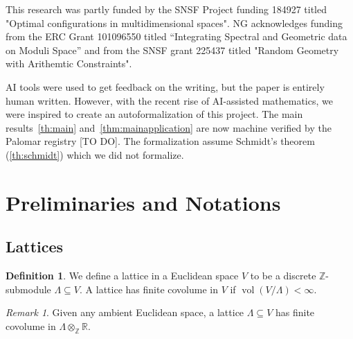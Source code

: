 \documentclass{amsart}
\theoremstyle{definition}
\newtheorem{definition}[theorem]{Definition}
\theoremstyle{remark}
\newtheorem{remark}[theorem]{Remark}
\DeclareMathOperator{\vol}{vol}
\DeclareMathOperator{\N}{N}
\newcommand{\nihar}{\color{olive}}
\begin{document}
This research was partly funded by the SNSF Project funding 184927 titled "Optimal configurations in multidimensional spaces". 
NG acknowledges funding from the ERC Grant
101096550 titled ``Integrating Spectral and Geometric data on Moduli Space'' and 
from the SNSF grant 225437 titled "Random Geometry with Arithemtic Constraints". 

AI tools were used to get feedback on the writing, but the paper is entirely human written.
However, with the recent rise of AI-assisted mathematics, we were inspired to create an autoformalization
of this project. The main results~\cref{th:main} and~\cref{thm:mainapplication} are now machine verified by the Palomar registry {[\nihar TO DO}]. 
The formalization assume Schmidt's theorem (\cref{th:schmidt}) which we did not formalize. 




%
%
%

\section{Preliminaries and Notations}

\subsection{Lattices}

\begin{definition}
    We define a lattice in a Euclidean space $V$ to be a discrete $\mathbb{Z}$-submodule $\Lambda \subseteq V$. 
    A lattice has finite covolume in $V$ if 
    $\vol(V/\Lambda) < \infty$.
\end{definition}
\begin{remark}
    Given any ambient Euclidean space, a lattice $\Lambda \subseteq V$ has finite covolume in $\Lambda \otimes_{\mathbb{Z}} \mathbb{R}$.
\end{remark}
\end{document}
